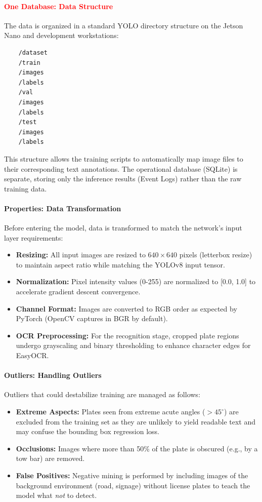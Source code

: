 \paragraph{\textcolor{red}{One Database: Data Structure}}
The data is organized in a standard YOLO directory structure on the Jetson Nano and development workstations:
\begin{verbatim}
	/dataset
	/train
	/images
	/labels
	/val
	/images
	/labels
	/test
	/images
	/labels
\end{verbatim}
This structure allows the training scripts to automatically map image files to their corresponding text annotations. The operational database (SQLite) is separate, storing only the inference results (Event Logs) rather than the raw training data.

\paragraph{Properties: Data Transformation}
Before entering the model, data is transformed to match the network's input layer requirements:
\begin{itemize}
	\item \textbf{Resizing:} All input images are resized to $640 \times 640$ pixels (letterbox resize) to maintain aspect ratio while matching the YOLOv8 input tensor.
	\item \textbf{Normalization:} Pixel intensity values (0-255) are normalized to [0.0, 1.0] to accelerate gradient descent convergence.
	\item \textbf{Channel Format:} Images are converted to RGB order as expected by PyTorch (OpenCV captures in BGR by default).
	\item \textbf{OCR Preprocessing:} For the recognition stage, cropped plate regions undergo grayscaling and binary thresholding to enhance character edges for EasyOCR.
\end{itemize}

\paragraph{Outliers: Handling Outliers}
Outliers that could destabilize training are managed as follows:
\begin{itemize}
	\item \textbf{Extreme Aspects:} Plates seen from extreme acute angles ($>45^\circ$) are excluded from the training set as they are unlikely to yield readable text and may confuse the bounding box regression loss.
	\item \textbf{Occlusions:} Images where more than 50\% of the plate is obscured (e.g., by a tow bar) are removed.
	\item \textbf{False Positives:} Negative mining is performed by including images of the background environment (road, signage) without license plates to teach the model what \textit{not} to detect.
\end{itemize}

